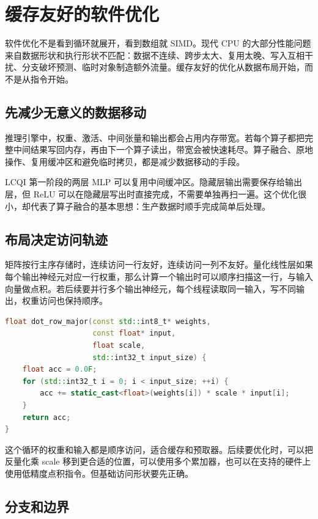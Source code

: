 \chapter{缓存友好的软件优化}

软件优化不是看到循环就展开，看到数组就 SIMD。现代 CPU 的大部分性能问题来自数据形状和执行形状不匹配：数据不连续、跨步太大、复用太晚、写入互相干扰、分支破坏预测、临时对象制造额外流量。缓存友好的优化从数据布局开始，而不是从指令开始。

\section{先减少无意义的数据移动}

推理引擎中，权重、激活、中间张量和输出都会占用内存带宽。若每个算子都把完整中间结果写回内存，再由下一个算子读出，带宽会被快速耗尽。算子融合、原地操作、复用缓冲区和避免临时拷贝，都是减少数据移动的手段。

LCQI 第一阶段的两层 MLP 可以复用中间缓冲区。隐藏层输出需要保存给输出层，但 ReLU 可以在隐藏层写出时直接完成，不需要单独再扫一遍。这个优化很小，却代表了算子融合的基本思想：生产数据时顺手完成简单后处理。

\section{布局决定访问轨迹}

矩阵按行主序存储时，连续访问一行友好，连续访问一列不友好。量化线性层如果每个输出神经元对应一行权重，那么计算一个输出时可以顺序扫描这一行，与输入向量做点积。若后续要并行多个输出神经元，每个线程读取同一输入，写不同输出，权重访问也保持顺序。

\begin{lstlisting}[language=C++,caption={行主序权重点积的访问形状}]
float dot_row_major(const std::int8_t* weights,
                    const float* input,
                    float scale,
                    std::int32_t input_size) {
    float acc = 0.0F;
    for (std::int32_t i = 0; i < input_size; ++i) {
        acc += static_cast<float>(weights[i]) * scale * input[i];
    }
    return acc;
}
\end{lstlisting}

这个循环的权重和输入都是顺序访问，适合缓存和预取器。后续要优化时，可以把反量化乘 scale 移到更合适的位置，可以使用多个累加器，也可以在支持的硬件上使用低精度点积指令。但基础访问形状要先正确。

\section{分支和边界}

